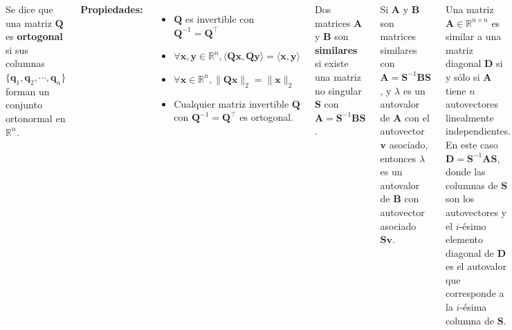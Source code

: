 \documentclass[9pt, aspectratio=169]{beamer}
\begin{document}
\begin{frame}
\begin{columns}[t]
\cx
\begin{definition}
    Se dice que una matriz $\bm{Q}$ es \textbf{ortogonal} si sus columnas $\{ \bm{q}_1,  \bm{q}_2, \cdots, \bm{q}_n \}$ forman un conjunto ortonormal en $\mathbb{R}^n$.
\end{definition} \pause
\textbf{Propiedades:}
\begin{itemize}
    \item $\bm{Q}$ es invertible con $\bm{Q}^{-1} = \bm{Q}^{\intercal}$
    \item $\forall \bm{x}, \bm{y} \in \mathbb{R}^n, \langle \bm{Q}\bm{x}, \bm{Q} \bm{y} \rangle = \langle \bm{x}, \bm{y} \rangle$
    \item $\forall \bm{x} \in \mathbb{R}^n, \lVert \bm{Q} \bm{x} \rVert_2 = \lVert \bm{x} \rVert_2$
    \item Cualquier matriz invertible $\bm{Q}$ con $\bm{Q}^{-1} = \bm{Q}^{\intercal}$ es ortogonal.
\end{itemize} \pause

\begin{definition}
    Dos matrices $\bm{A}$ y $\bm{B}$ son \textbf{similares} si existe una matriz no singular $\bm{S}$ con $\bm{A} = \bm{S}^{-1} \bm{B} \bm{S}$.
\end{definition} \pause

\cx
\begin{theorem}
    Si $\bm{A}$ y $\bm{B}$ son matrices similares con $\bm{A} = \bm{S}^{-1} \bm{B} \bm{S}$, y $\lambda$ es un autovalor de $\bm{A}$ con el autovector $\bm{v}$ asociado, entonces $\lambda$ es un autovalor de $\bm{B}$ con autovector asociado $\bm{S} \bm{v}$.
\end{theorem} \pause

\begin{theorem}
Una matriz $ \bm{A} \in \mathbb{R}^{n \times n} $ es similar a una matriz diagonal $\bm{D}$ si y sólo si $\bm{A}$ tiene $n$ autovectores linealmente independientes. En este caso $\bm{D} = \bm{S}^{-1} \bm{A} \bm{S}$, donde las columnas de $\bm{S}$ son los autovectores y el $i$-ésimo elemento diagonal de $\bm{D}$ es el autovalor que corresponde a la $i$-ésima columna de $\bm{S}$.
\end{theorem} 
\end{columns}
\end{frame}
\end{document}
